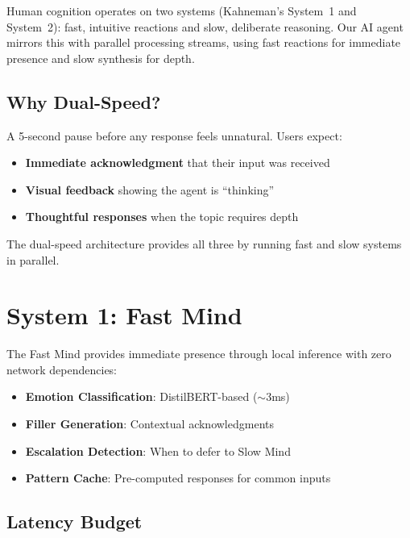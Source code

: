 \documentclass[11pt,letterpaper]{article}
\begin{document}
\begin{tldrbox}
Human cognition operates on two systems (Kahneman's System~1 and System~2): fast, intuitive reactions and slow, deliberate reasoning. Our AI agent mirrors this with parallel processing streams, using fast reactions for immediate presence and slow synthesis for depth.
\end{tldrbox}

\subsection{Why Dual-Speed?}

A 5-second pause before any response feels unnatural. Users expect:
\begin{itemize}
  \item \textbf{Immediate acknowledgment} that their input was received
  \item \textbf{Visual feedback} showing the agent is ``thinking''
  \item \textbf{Thoughtful responses} when the topic requires depth
\end{itemize}

The dual-speed architecture provides all three by running fast and slow systems in parallel.

\section{System 1: Fast Mind}

\begin{systembox}
The Fast Mind provides immediate presence through local inference with zero network dependencies:

\begin{itemize}
  \item \textbf{Emotion Classification}: DistilBERT-based ($\sim$3ms)
  \item \textbf{Filler Generation}: Contextual acknowledgments
  \item \textbf{Escalation Detection}: When to defer to Slow Mind
  \item \textbf{Pattern Cache}: Pre-computed responses for common inputs
\end{itemize}
\end{systembox}

\subsection{Latency Budget}
\end{document}
